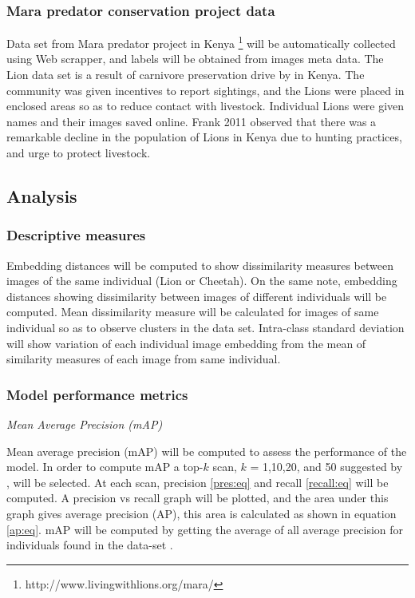 \subsubsection{Mara predator conservation project data}
Data set from Mara predator project in Kenya \footnote{http://www.livingwithlions.org/mara/}  will be automatically collected using Web scrapper, and labels will be obtained from images meta data. The Lion data set is a result of carnivore preservation drive by \citeauthor{frank2011living} \citeyear{frank2011living} \cite{frank2011living} in Kenya. The community was given incentives to report sightings, and the Lions were placed in enclosed areas so as to reduce contact with livestock. Individual Lions were given names and their images saved online. Frank 2011 observed that there was a remarkable decline in the population of Lions in Kenya due to hunting practices, and urge to protect livestock.  
\subsection{Analysis}
\subsubsection{Descriptive measures }
Embedding distances will be computed to show dissimilarity measures between images of the same individual (Lion or Cheetah). On the same note, embedding distances showing dissimilarity between images of different individuals will be computed. Mean dissimilarity measure will be calculated for images of same individual so as to observe clusters in the data set. Intra-class standard deviation will show variation of each individual image embedding from the mean of similarity measures of each image from same individual.  

\subsubsection{Model performance  metrics}
\textit{Mean Average Precision (mAP)}\newline

Mean average precision (mAP) will be computed to assess the performance of the model. In order to compute mAP a top-$k$ scan, $k$ = 1,10,20, and 50 suggested by \citeauthor{muller2001performance} \citeyear{muller2001performance} \cite{muller2001performance}, will be selected. At each scan, precision \ref{pres:eq} and recall \ref{recall:eq} will be computed. A precision vs recall graph will be plotted, and the area under this graph gives average precision (AP), this area is calculated as shown in equation \ref{ap:eq}.  mAP  will be computed by getting the average of all average precision for individuals found in the data-set \cite{everingham2015pascal}.


